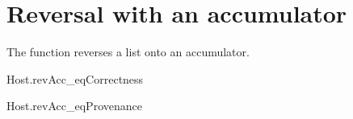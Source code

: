 \documentclass{article}
\begin{document}
\section{Reversal with an accumulator}

The function  reverses a list onto an accumulator.

\begin{leanblock}{Host.revAcc_eq}{Correctness}
\end{leanblock}

\begin{leanblock}[view=meta]{Host.revAcc_eq}{Provenance}
\end{leanblock}
\end{document}
